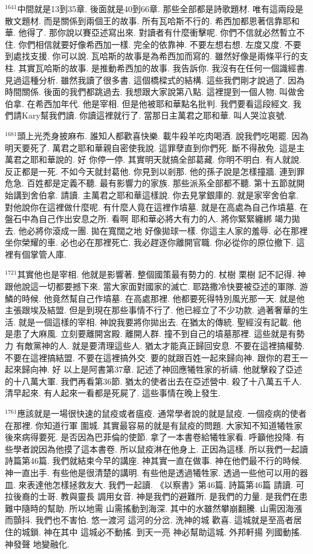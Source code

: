 \documentclass{book}
\begin{document}
$^{1641}$中間就是13到35章.
後面就是40到66章.
那些全部都是詩歌題材.
唯有這兩段是散文題材.
而是關係到兩個王的故事.
所有瓦哈斯不行的.
希西加都恩著信靠耶和華.
他得了.
那你說以賽亞述寫出來.
對讀者有什麼衝擊呢.
你們不信就必然暫立不住.
你們相信就要好像希西加一樣.
完全的依靠神.
不要左想右想.
左度又度.
不要到處找支援.
你可以說.
瓦哈斯的故事是為希西加而寫的.
雖然好像是兩條平行的支柱.
其實瓦哈斯的故事.
是推動希西加的故事.
我告訴你.
我沒有在任何一個識經書.
見過這種分析.
雖然我讀了很多書.
這個橋樑式的結構.
這些我們剛才說過了.
因為時間關係.
後面的我們都跳過去.
我想跟大家說第八點.
這裡提到一個人物.
叫做舍伯拿.
在希西加年代.
他是宰相.
但是他被耶和華點名批判.
我們要看這段經文.
我們請Kary幫我們讀.
你讀這裡就行了.
當那日主萬君之耶和華.
叫人哭泣哀號.

$^{1681}$頭上光禿身披麻布.
誰知人都歡喜快樂.
載牛殺羊吃肉喝酒.
說我們吃喝罷.
因為明天要死了.
萬君之耶和華親自密使我說.
這罪孽直到你們死.
斷不得赦免.
這是主萬君之耶和華說的.
好 你停一停.
其實明天就搞全部葛藏.
你明不明白.
有人就說.
反正都是一死.
不如今天就封葛他.
你見到以剎那.
他的孫子說是怎樣撞牆.
連到罪危急.
百姓都是定義不聽.
最有影響力的家族.
那些派系全部都不聽.
第十五節就開始講到舍伯拿.
請讀.
主萬君之耶和華這樣說.
你去見掌銀庫的.
就是家宰舍伯拿.
對他說你在這裡做什麼呢.
有什麼人竟在這裡作墳墓.
就是在高處為自己作墳墓.
在盤石中為自己作出安息之所.
看啊 耶和華必將大有力的人.
將你緊緊纏綁 竭力拋去.
他必將你滾成一團.
拋在寬闊之地 好像拋球一樣.
你這主人家的羞辱.
必在那裡坐你榮耀的車.
必也必在那裡死亡.
我必趕逐你離開官職.
你必從你的原位撤下.
這裡有個掌管人庫.

$^{1721}$其實他也是宰相.
他就是影響著.
整個國策最有勢力的.
杖樹 栗樹 記不記得.
神跟他說這一切都要撼下來.
當大家面對國家的滅亡.
耶路撒冷快要被亞述的軍隊.
游鱗的時候.
他竟然幫自己作墳墓.
在高處那裡.
他都要死得特別風光那一天.
就是他主張跟埃及結盟.
但是到現在那些事情不行了.
他已經立了不少功款.
過著奢華的生活.
就是一個這樣的宰相.
神說我要將你拋出去.
在猶太的傳統.
聖經沒有記載.
他是患了大麻風.
立刻要離開宮殿.
離開人群.
撞不到自己的墳墓那裡.
這些就是有勢力 有敵黨神的人.
就是要清理這些人.
猶太才能真正歸回安息.
不要在這裡搞權勢.
不要在這裡搞結盟.
不要在這裡搞外交.
要的就跟百姓一起來歸向神.
跟你的君王一起來歸向神.
好 以上是阿書第37章.
記述了神回應犧牲家的祈禱.
他就擊殺了亞述的十八萬大軍.
我們再看第36節.
猶太的使者出去在亞述營中.
殺了十八萬五千人.
清早起來.
有人起來一看都是死屍了.
這些事情在晚上發生.

$^{1761}$應該就是一場很快速的鼠疫或者瘟疫.
通常學者說的就是鼠疫.
一個疫病的使者在那裡.
你知道行軍 圍城.
其實最容易的就是有鼠疫的問題.
大家知不知道犧牲家後來病得要死.
是否因為巴菲倫的使節.
拿了一本書卷給犧牲家看.
呼籲他投降.
有些學者說因為他摸了這本書卷.
所以鼠疫淋在他身上.
正因為這樣.
所以我們一起讀詩篇第46篇.
我們就結束今早的講座.
神其實一直在做事.
神在他們最不行的時候.
神一直出手.
有些他是很清楚的講明.
有些他是透過犧牲家.
透過一些他可以用的器皿.
來表達他怎樣拯救友大.
我們一起讀.
《以察書》第46篇.
詩篇第46篇 請讀.
可拉後裔的士哥.
教與靈長 調用女音.
神是我們的避難所.
是我們的力量.
是我們在患難中隨時的幫助.
所以地需 山需搖動到海深.
其中的水雖然攀崩翻騰.
山需因海漲而顫抖.
我們也不害怕.
悠一渡河 這河的分岔.
洗神的城 歡喜.
這城就是至高者居住的城鎖.
神在其中 這城必不動搖.
到天一亮 神必幫助這城.
外邦軒揚 列國動搖.
神發聲 地變融化.
\end{document}
